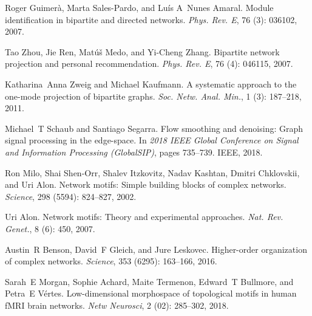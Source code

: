 Roger Guimer{\`a}, Marta {Sales-Pardo}, and Lu{\'i}s A~Nunes Amaral.
\newblock Module identification in bipartite and directed networks.
\newblock \emph{Phys. Rev. E}, 76 (3): 036102, 2007.

Tao Zhou, Jie Ren, Mat{\'u}{\v s} Medo, and Yi-Cheng Zhang.
\newblock Bipartite network projection and personal recommendation.
\newblock \emph{Phys. Rev. E}, 76 (4): 046115,
2007{}.

Katharina~Anna Zweig and Michael Kaufmann.
\newblock A systematic approach to the one-mode projection of bipartite graphs.
\newblock \emph{Soc. Netw. Anal. Min.}, 1 (3): 187--218,
2011.

Michael~T Schaub and Santiago Segarra.
\newblock Flow smoothing and denoising: Graph signal processing in the
edge-space.
\newblock In \emph{2018 {{IEEE}} Global Conference on Signal and Information
    Processing ({{GlobalSIP}})}, pages 735--739. {IEEE}, 2018.

Ron Milo, Shai {Shen-Orr}, Shalev Itzkovitz, Nadav Kashtan, Dmitri Chklovskii,
and Uri Alon.
\newblock Network motifs: Simple building blocks of complex networks.
\newblock \emph{Science}, 298 (5594): 824--827, 2002.

Uri Alon.
\newblock Network motifs: Theory and experimental approaches.
\newblock \emph{Nat. Rev. Genet.}, 8 (6): 450, 2007.

Austin~R Benson, David~F Gleich, and Jure Leskovec.
\newblock Higher-order organization of complex networks.
\newblock \emph{Science}, 353 (6295): 163--166, 2016.

Sarah~E Morgan, Sophie Achard, Maite Termenon, Edward~T Bullmore, and Petra~E
V{\'e}rtes.
\newblock Low-dimensional morphospace of topological motifs in human {{fMRI}}
brain networks.
\newblock \emph{Netw Neurosci}, 2 (02): 285--302, 2018.

